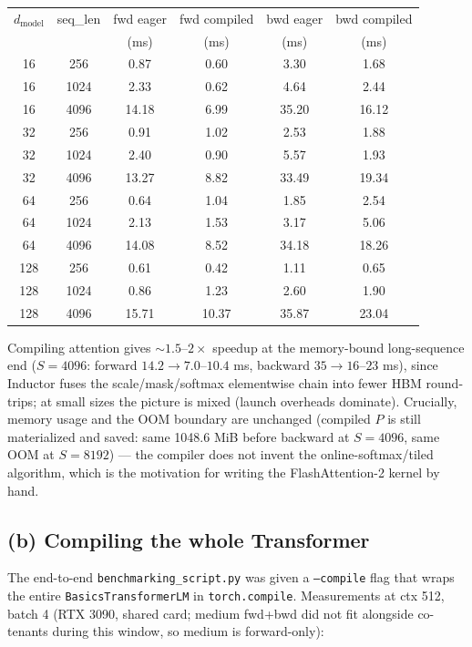 \documentclass[11pt]{article}
\newcommand{\code}[1]{\texttt{#1}}
\begin{document}
\begin{center}\small
\begin{tabular}{cccccc}
\toprule
$d_{\text{model}}$ & seq\_len & fwd eager & fwd compiled & bwd eager & bwd compiled \\
 & & (ms) & (ms) & (ms) & (ms) \\
\midrule
16  & 256  & 0.87  & 0.60  & 3.30  & 1.68 \\
16  & 1024 & 2.33  & 0.62  & 4.64  & 2.44 \\
16  & 4096 & 14.18 & 6.99  & 35.20 & 16.12 \\
32  & 256  & 0.91  & 1.02  & 2.53  & 1.88 \\
32  & 1024 & 2.40  & 0.90  & 5.57  & 1.93 \\
32  & 4096 & 13.27 & 8.82  & 33.49 & 19.34 \\
64  & 256  & 0.64  & 1.04  & 1.85  & 2.54 \\
64  & 1024 & 2.13  & 1.53  & 3.17  & 5.06 \\
64  & 4096 & 14.08 & 8.52  & 34.18 & 18.26 \\
128 & 256  & 0.61  & 0.42  & 1.11  & 0.65 \\
128 & 1024 & 0.86  & 1.23  & 2.60  & 1.90 \\
128 & 4096 & 15.71 & 10.37 & 35.87 & 23.04 \\
\bottomrule
\end{tabular}
\end{center}

Compiling attention gives ${\sim}1.5$--$2\times$ speedup at the memory-bound long-sequence end
($S{=}4096$: forward $14.2 \to 7.0$--$10.4$ ms, backward $35 \to 16$--$23$ ms), since Inductor fuses
the scale/mask/softmax elementwise chain into fewer HBM round-trips; at small sizes the picture is
mixed (launch overheads dominate). Crucially, memory usage and the OOM boundary are unchanged
(compiled $P$ is still materialized and saved: same 1048.6 MiB before backward at $S{=}4096$, same
OOM at $S{=}8192$) --- the compiler does not invent the online-softmax/tiled algorithm, which is the
motivation for writing the FlashAttention-2 kernel by hand.

\subsection{(b) Compiling the whole Transformer}

The end-to-end \code{benchmarking\_script.py} was given a \code{--compile} flag that wraps the entire
\code{BasicsTransformerLM} in \code{torch.compile}. Measurements at ctx 512, batch 4 (RTX 3090,
shared card; medium fwd+bwd did not fit alongside co-tenants during this window, so medium is
forward-only):
\end{document}
